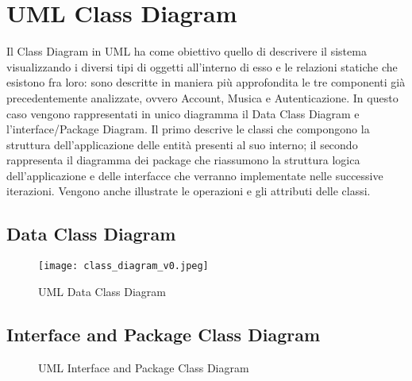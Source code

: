 \newpage

\section{UML Class Diagram}
Il Class Diagram in UML ha come obiettivo quello di descrivere il sistema 
visualizzando i diversi tipi di oggetti all'interno di esso e le relazioni 
statiche che esistono fra loro: sono descritte in maniera più approfondita 
le tre componenti già precedentemente analizzate, ovvero Account, Musica e 
Autenticazione.
In questo caso vengono rappresentati in unico diagramma il Data Class Diagram 
e l'interface/Package Diagram.
Il primo descrive le classi che compongono la struttura dell'applicazione 
delle entità presenti al suo interno; il secondo rappresenta il diagramma
 dei package che riassumono la struttura logica dell’applicazione 
e delle interfacce che verranno implementate nelle successive iterazioni.
Vengono anche illustrate le operazioni e gli attributi delle classi. 
\subsection{Data Class Diagram}
\begin{figure}[H]
    \centering
    \texttt{[image: class\_diagram\_v0.jpeg]}
    \caption{UML Data Class Diagram}
    \label{fig-uml-data-class-diag}
\end{figure}
\newpage
\subsection{Interface and Package Class Diagram}
\begin{figure}[H]
    \centering
    \caption{UML Interface and Package Class Diagram}
    \label{fig-uml-packageif-class-diag}
\end{figure}